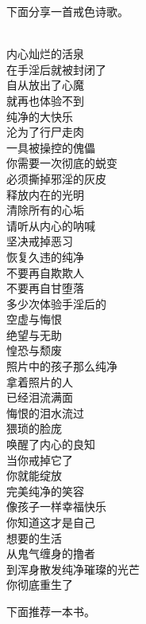 下面分享一首戒色诗歌。

\begin{poem}[开启内心纯净的活泉]
    \begin{multicols}{3}
        \centering~\\
        内心灿烂的活泉 \\ 在手淫后就被封闭了 \\ 自从放出了心魔 \\ 就再也体验不到 \\ 纯净的大快乐 \\ 沦为了行尸走肉 \\ 一具被操控的傀儡 \\ 你需要一次彻底的蜕变 \\ 必须撕掉邪淫的灰皮 \\ 释放内在的光明 \\ 清除所有的心垢 \\ 请听从内心的呐喊 \\ 坚决戒掉恶习 \\ 恢复久违的纯净 \\ 不要再自欺欺人 \\ 不要再自甘堕落 \\ 多少次体验手淫后的 \\ 空虚与悔恨 \\ 绝望与无助 \\ 惶恐与颓废 \\ 照片中的孩子那么纯净 \\ 拿着照片的人 \\ 已经泪流满面 \\ 悔恨的泪水流过 \\ 猥琐的脸庞 \\ 唤醒了内心的良知 \\ 当你戒掉它了 \\ 你就能绽放 \\ 完美纯净的笑容 \\ 像孩子一样幸福快乐 \\ 你知道这才是自己 \\ 想要的生活 \\ 从鬼气缠身的撸者 \\ 到浑身散发纯净璀璨的光芒 \\ 你彻底重生了
    \end{multicols}
\end{poem}

下面推荐一本书。

